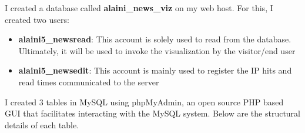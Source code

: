 \documentclass[12pt]{article}
\begin{document}
I created a database called \textbf{alaini\_news\_viz} on my web host. For this, I created two users:\\
\begin{itemize}
\item \textbf{alaini5\_newsread}: This account is solely used to read from the database. Ultimately, it will be used to invoke the visualization by the visitor/end user
\item \textbf{alaini5\_newsedit}: This account is mainly used to register the IP hits and read times communicated to the server
\end{itemize}

\newpage

I created 3 tables in MySQL using phpMyAdmin, an open source PHP based GUI that facilitates interacting with the MySQL system. Below are the structural details of each table.
\end{document}
